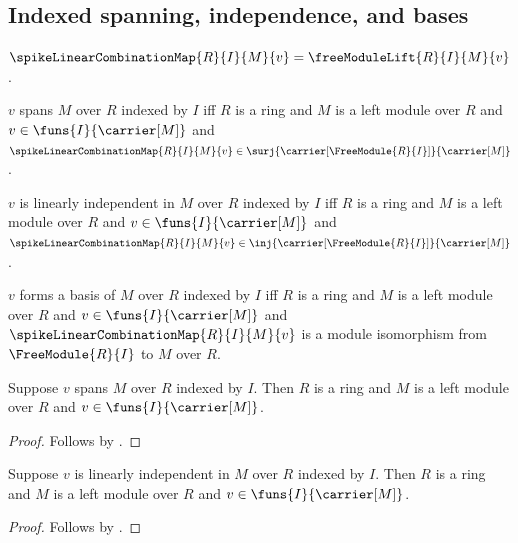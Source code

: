 \subsection{Indexed spanning, independence, and bases}

\begin{definition}\label{spike_linear_combination_map}
    $\spikeLinearCombinationMap{R}{I}{M}{v}
        =\freeModuleLift{R}{I}{M}{v}$.
\end{definition}

\begin{definition}\label{spike_phrase_indexed_module_spanning}
    $v$ spans $M$ over $R$ indexed by $I$ iff
        $R$ is a ring and $M$ is a left module over $R$ and
        $v\in\funs{I}{\carrier[M]}$ and
        $\spikeLinearCombinationMap{R}{I}{M}{v}\in
            \surj{\carrier[\FreeModule{R}{I}]}{\carrier[M]}$.
\end{definition}

\begin{definition}\label{spike_phrase_indexed_module_linear_independence}
    $v$ is linearly independent in $M$ over $R$ indexed by $I$ iff
        $R$ is a ring and $M$ is a left module over $R$ and
        $v\in\funs{I}{\carrier[M]}$ and
        $\spikeLinearCombinationMap{R}{I}{M}{v}\in
            \inj{\carrier[\FreeModule{R}{I}]}{\carrier[M]}$.
\end{definition}

\begin{definition}\label{spike_phrase_indexed_module_basis}
    $v$ forms a basis of $M$ over $R$ indexed by $I$ iff
        $R$ is a ring and $M$ is a left module over $R$ and
        $v\in\funs{I}{\carrier[M]}$ and
        $\spikeLinearCombinationMap{R}{I}{M}{v}$ is a module isomorphism
            from $\FreeModule{R}{I}$ to $M$ over $R$.
\end{definition}

\begin{proposition}\label{spike_phrase_spanning_guards}
    Suppose $v$ spans $M$ over $R$ indexed by $I$.
    Then $R$ is a ring and $M$ is a left module over $R$ and
        $v\in\funs{I}{\carrier[M]}$.
\end{proposition}
\begin{proof}
    Follows by .
\end{proof}

\begin{proposition}\label{spike_phrase_linear_independence_guards}
    Suppose $v$ is linearly independent in $M$ over $R$ indexed by $I$.
    Then $R$ is a ring and $M$ is a left module over $R$ and
        $v\in\funs{I}{\carrier[M]}$.
\end{proposition}
\begin{proof}
    Follows by .
\end{proof}

